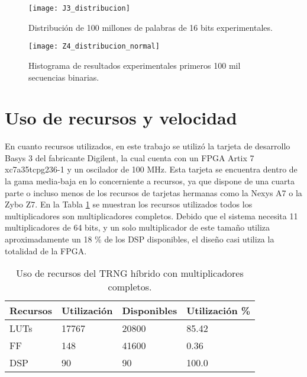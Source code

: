         \begin{figure}[hbtp]
            \centering
            \texttt{[image: J3\_distribucion]}
            \caption{Distribución de 100 millones de palabras de 16 bits experimentales.}
            \label{fig:J3_distribucion}
        \end{figure}


        \begin{figure}[hbtp]
            \centering
            \texttt{[image: Z4\_distribucion\_normal]}
            \caption{Histograma de resultados experimentales primeros 100 mil secuencias binarias.}
            \label{fig:J4_distribucion}
        \end{figure}



    \section{Uso de recursos y velocidad}

        En cuanto recursos utilizados, en este trabajo se utilizó la tarjeta de desarrollo Basys 3 del fabricante Digilent, la cual cuenta con un FPGA Artix 7 xc7a35tcpg236-1 y un oscilador de 100 MHz. Esta tarjeta se encuentra dentro de la gama media-baja en lo concerniente a recursos, ya que dispone de una cuarta parte o incluso menos de los recursos de tarjetas hermanas como la Nexys A7 o la Zybo Z7. En la Tabla \ref{tab:recursos} se muestran los recursos utilizados todos los multiplicadores son multiplicadores completos. Debido que el sistema necesita 11 multiplicadores de 64 bits, y un solo multiplicador de este tamaño utiliza aproximadamente un 18 \% de los DSP disponibles, el diseño casi utiliza la totalidad de la FPGA. 

        \begin{table}[htbp]
            \centering
            \caption{Uso de recursos del TRNG híbrido con multiplicadores completos.}
            \begin{tabular}{|l|l|l|l|}
                \hline
                \rowcolor{lightgray} Recursos  & Utilización & Disponibles & Utilización \% \\
                \hline
                LUTs      & 17767  & 20800    & 85.42  \\
                \hline
                FF     &  148 & 41600   & 0.36 \\
                \hline
                DSP       & 90  & 90   & 100.0 \\
                \hline
            \end{tabular}
            \label{tab:recursos}
        \end{table}

